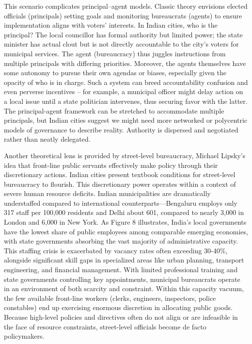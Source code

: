 This scenario complicates principal--agent models. Classic theory envisions elected officials (principals) setting goals and monitoring bureaucrats (agents) to ensure implementation aligns with voters' interests. In Indian cities, who is the principal? The local councillor has formal authority but limited power; the state minister has actual clout but is not directly accountable to the city's voters for municipal services. The agent (bureaucracy) thus juggles instructions from multiple principals with differing priorities. Moreover, the agents themselves have some autonomy to pursue their own agendas or biases, especially given the opacity of who is in charge. Such a system can breed accountability confusion and even perverse incentives – for example, a municipal officer might delay action on a local issue until a state politician intervenes, thus securing favor with the latter. The principal-agent framework can be stretched to accommodate multiple principals, but Indian cities suggest we might need more networked or polycentric models of governance to describe reality. Authority is dispersed and negotiated rather than neatly delegated.

Another theoretical lens is provided by street-level bureaucracy, Michael Lipsky's idea that front-line public servants effectively make policy through their discretionary actions. Indian cities present textbook conditions for street-level bureaucracy to flourish. This discretionary power operates within a context of severe human resource deficits. Indian municipalities are dramatically understaffed compared to international counterparts—Bengaluru employs only 317 staff per 100,000 residents and Delhi about 601, compared to nearly 3,000 in London and 6,000 in New York. As Figure 8 illustrates, India's local governments have the lowest share of public employees among comparable emerging economies, with state governments absorbing the vast majority of administrative capacity. This staffing crisis is exacerbated by vacancy rates often exceeding 30-40\%, alongside significant skill gaps in specialized areas like urban planning, transport engineering, and financial management. With limited professional training and state governments controlling key appointments, municipal bureaucrats operate in an environment of both scarcity and constraint. Within this capacity vacuum, the few available front-line workers (clerks, engineers, inspectors, police constables) end up exercising enormous discretion in allocating public goods. Because high-level policies and directives often do not align or are infeasible in the face of resource constraints, street-level officials become de facto policymakers.

